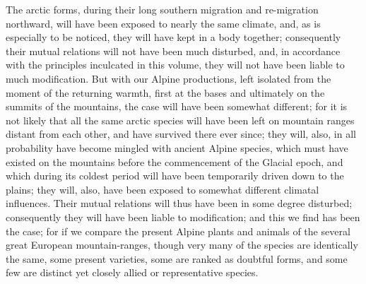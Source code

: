 \indent The arctic forms, during their long southern migration and re-migration northward, will have been exposed to nearly the same climate, and, as is especially to be noticed, they will have kept in a body together; consequently their mutual relations will not have been much disturbed, and, in accordance with the principles inculcated in this volume, they will not have been liable to much modification. But with our Alpine productions, left isolated from the moment of the returning warmth, first at the bases and ultimately on the summits of the mountains, the case will have been somewhat different; for it is not likely that all the same arctic species will have been left on mountain ranges distant from each other, and have survived there ever since; they will, also, in all probability have become mingled with ancient Alpine species, which must have existed on the mountains before the commencement of the Glacial epoch, and which during its coldest period will have been temporarily driven down to the plains; they will, also, have been exposed to somewhat different climatal influences. Their mutual relations will thus have been in some degree disturbed; consequently they will have been liable to modification; and this we find has been the case; for if we compare the present Alpine plants and animals of the several great European mountain-ranges, though very many of the species are identically the same, some present varieties, some are ranked as doubtful forms, and some few are distinct yet closely allied or representative species.~\\
